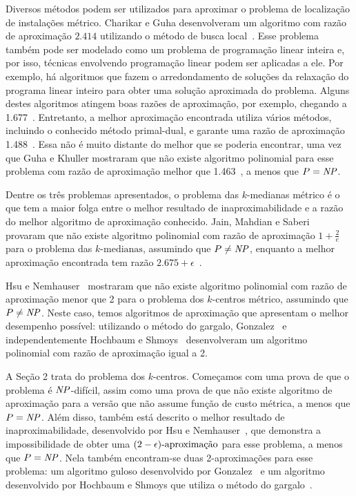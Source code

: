 \documentclass[12pt]{article}
\begin{document}
Diversos métodos podem ser utilizados para aproximar o problema de localização de instalações métrico. Charikar e Guha desenvolveram um algoritmo com razão de aproximação $2.414$ utilizando o método de busca local~\cite{Charikar&Guha'05}.  Esse problema também pode ser modelado como um problema de programação linear inteira e, por isso, técnicas envolvendo programação linear podem ser aplicadas a ele.  Por exemplo, há algoritmos que fazem o arredondamento de soluções da relaxação do programa linear inteiro para obter uma solução aproximada do problema.  Alguns destes algoritmos atingem boas razões de aproximação, por exemplo, chegando a 1.677~\cite{Byrka&Aardal'10}. Entretanto, a melhor aproximação encontrada utiliza vários métodos, incluindo o conhecido método primal-dual, e garante uma razão de aproximação 1.488~\cite{LI'13}. Essa não é muito distante do melhor que se poderia encontrar, uma vez que Guha e Khuller mostraram que não existe algoritmo polinomial para esse problema com razão de aproximação melhor que 1.463~\cite{GUHA1999228}, a menos que $P = \mathit{NP}$.


Dentre os três problemas apresentados, o problema das $k$-medianas métrico é o que tem a maior folga entre o melhor resultado de inaproximabilidade e a razão do melhor algoritmo de aproximação conhecido. Jain, Mahdian e Saberi~\cite{JMS'02} provaram que não existe algoritmo polinomial com razão de aproximação $1+ \frac{2}{e}$ para o problema das $k\text{-medianas}$, assumindo que $P \neq \mathit{NP}$, enquanto a melhor aproximação encontrada tem razão $2.675 + \epsilon$~\cite{BPRST'17}.


Hsu e Nemhauser~\cite{HSU1979209} mostraram que não existe algoritmo polinomial com razão de aproximação menor que 2 para o problema dos $k$-centros métrico, assumindo que $P\neq\mathit{NP}$. Neste caso, temos algoritmos de aproximação que apresentam o melhor desempenho possível: utilizando o método do gargalo, Gonzalez~\cite{GONZALEZ1985293} e independentemente Hochbaum e Shmoys~\cite{HochShmoys'85} desenvolveram um algoritmo polinomial com razão de aproximação igual a 2.

A Seção 2 trata do problema dos $k$-centros. Começamos com uma prova de que o problema é $\mathit{NP}$-difícil, assim como uma prova de que não existe algoritmo de aproximação para a versão que não assume função de custo métrica, a menos que $P = \mathit{NP}$. Além disso, também está descrito o melhor resultado de inaproximabilidade, desenvolvido por Hsu e Nemhauser~\cite{HSU1979209}, que demonstra a impossibilidade de obter uma ${(2-\epsilon)\text{-aproximação}}$ para esse problema, a menos que $P = \mathit{NP}$. Nela também encontram-se duas 2-aproximações para esse problema: um algoritmo guloso desenvolvido por Gonzalez~\cite{GONZALEZ1985293} e um algoritmo desenvolvido por Hochbaum e Shmoys que utiliza o método do gargalo~\cite{HSBottle}.
\end{document}
